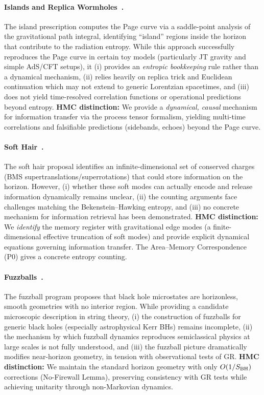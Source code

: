 \documentclass[a4paper,11pt]{article}
\newcommand{\HMC}{\textup{\textsc{HMC}}\xspace}
\theoremstyle{plain}
\theoremstyle{definition}
\theoremstyle{remark}
\begin{document}
\paragraph{Islands and Replica Wormholes~\cite{Penington:2020, Almheiri:2020}.}
The island prescription computes the Page curve via a saddle-point analysis of the gravitational path integral, identifying ``island'' regions inside the horizon that contribute to the radiation entropy. While this approach successfully reproduces the Page curve in certain toy models (particularly JT gravity and simple AdS/CFT setups), it (i) provides an \emph{entropic bookkeeping} rule rather than a dynamical mechanism, (ii) relies heavily on replica trick and Euclidean continuation which may not extend to generic Lorentzian spacetimes, and (iii) does not yield time-resolved correlation functions or operational predictions beyond entropy.
\textbf{\HMC{} distinction:} We provide a \emph{dynamical, causal} mechanism for information transfer via the process tensor formalism, yielding multi-time correlations and falsifiable predictions (sidebands, echoes) beyond the Page curve.

\paragraph{Soft Hair~\cite{HPS:2016}.}
The soft hair proposal identifies an infinite-dimensional set of conserved charges (BMS supertranslations/superrotations) that could store information on the horizon. However, (i) whether these soft modes can actually encode and release information dynamically remains unclear, (ii) the counting arguments face challenges matching the Bekenstein--Hawking entropy, and (iii) no concrete mechanism for information retrieval has been demonstrated.
\textbf{\HMC{} distinction:} We \emph{identify} the memory register with gravitational edge modes (a finite-dimensional effective truncation of soft modes) and provide explicit dynamical equations governing information transfer. The Area--Memory Correspondence (P0) gives a concrete entropy counting.

\paragraph{Fuzzballs~\cite{Mathur:2005b, Mathur:2009}.}
The fuzzball program proposes that black hole microstates are horizonless, smooth geometries with no interior region. While providing a candidate microscopic description in string theory, (i) the construction of fuzzballs for generic black holes (especially astrophysical Kerr BHs) remains incomplete, (ii) the mechanism by which fuzzball dynamics reproduces semiclassical physics at large scales is not fully understood, and (iii) the fuzzball picture dramatically modifies near-horizon geometry, in tension with observational tests of GR.
\textbf{\HMC{} distinction:} We maintain the standard horizon geometry with only $O(1/S_{\rm BH})$ corrections (No-Firewall Lemma), preserving consistency with GR tests while achieving unitarity through non-Markovian dynamics.
\end{document}
